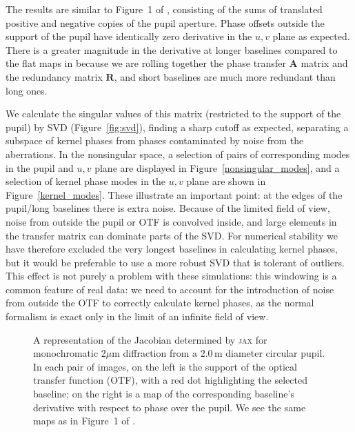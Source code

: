 \documentclass[modern]{aastex63}
\begin{document}
The results are similar to Figure~1 of \citet{martinache10}, consisting of the sums of translated positive and negative copies of the pupil aperture. Phase offsets outside the support of the pupil have identically zero derivative in the $u,v$ plane as expected. There is a greater magnitude in the derivative at longer baselines compared to the flat maps in \citet{martinache10} because we are rolling together the phase transfer $\mathbf{A}$ matrix and the redundancy matrix $\mathbf{R}$, and short baselines are much more redundant than long ones.

We calculate the singular values of this matrix (restricted to the support of the pupil) by SVD (Figure~\ref{fig:svd}), finding a sharp cutoff as expected, separating a subspace of kernel phases from phases contaminated by noise from the aberrations. In the nonsingular space, a selection of pairs of corresponding modes in the pupil and $u,v$ plane are displayed in Figure~\ref{nonsingular_modes}, and a selection of kernel phase modes in the $u,v$ plane are shown in Figure~\ref{kernel_modes}. These illustrate an important point: at the edges of the pupil/long baselines there is extra noise. Because of the limited field of view, noise from outside the pupil or OTF is convolved inside, and large elements in the transfer matrix can dominate parts of the SVD. For numerical stability we have therefore excluded the very longest baselines in calculating kernel phases, but it would be preferable to use a more robust SVD that is tolerant of outliers. This effect is not purely a problem with these simulations: this windowing is a common feature of real data: we need to account for the introduction of noise from outside the OTF to correctly calculate kernel phases, as the normal formalism is exact only in the limit of an infinite field of view. 

\begin{figure}
\caption{A representation of the Jacobian determined by \textsc{jax} for monochromatic 2$\mu$m diffraction from a 2.0\,m diameter circular pupil. In each pair of images, on the left is the support of the optical transfer function (OTF), with a red dot highlighting the selected baseline; on the right is a map of the corresponding baseline's derivative with respect to phase over the pupil. We see the same maps as in Figure~1 of \citet{martinache10}. \label{kernel_jacobian}}
\end{figure}
\end{document}
